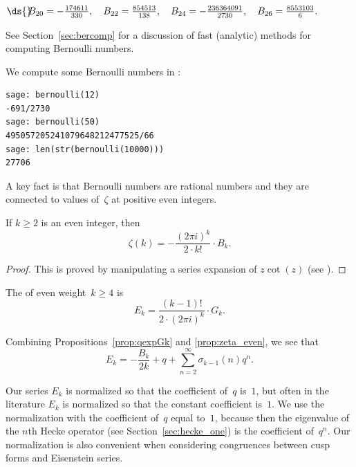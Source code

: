 \noindent{}
$\ds{}\!\!B_{20}=-\frac{174611}{330},\quad
B_{22}=\frac{854513}{138},\quad
B_{24}=-\frac{236364091}{2730},\quad
B_{26}=\frac{8553103}{6}.
$\vspace{1ex}\label{tbl:bern}

See Section~\ref{sec:bercomp} for a discussion of fast
(analytic) methods for computing Bernoulli numbers. 

We compute some Bernoulli numbers in \sage:
\begin{verbatim}
sage: bernoulli(12)
-691/2730
sage: bernoulli(50)
495057205241079648212477525/66
sage: len(str(bernoulli(10000)))
27706
\end{verbatim}


A key fact is that Bernoulli numbers are
rational numbers and they are connected to values of~$\zeta$ at
positive even integers.
\begin{proposition}\label{prop:zeta_even}
If $k\geq 2$ is an even integer, then
$$
  \zeta(k) = -\frac{(2\pi i)^{k}}{2\cdot k!}\cdot B_k.
$$
\end{proposition}
\begin{proof}
This is proved 
by manipulating a series expansion of $z \cot(z)$
(see \cite[Section~VII.4]{serre:arithmetic}).
\end{proof}

\begin{definition}
The  of even weight~$k\geq 4$ is
$$
  E_k = \frac{(k-1)!}{2\cdot (2\pi i)^k}\cdot G_k.
$$
\end{definition} 
Combining Propositions~\ref{prop:qexpGk} and
\ref{prop:zeta_even}, we see that
\begin{equation}\label{eqn:ekexp}
 E_k = -\frac{B_k}{2k} + q + \sum_{n=2}^{\infty} \sigma_{k-1}(n) q^n.
\end{equation}


\begin{warning} Our series $E_k$ is normalized so that the coefficient
  of~$q$ is~$1$, but often in the literature $E_k$ is normalized so
  that the constant coefficient is~$1$.  We use the normalization with
  the coefficient of~$q$ equal to~$1$, because then the eigenvalue of
  the $n$th Hecke operator (see Section~\ref{sec:hecke_one}) is the
  coefficient of~$q^n$.  Our normalization is also 
  convenient when considering congruences between cusp forms and
  Eisenstein series.
\end{warning}

